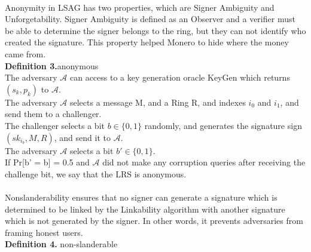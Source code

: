     \\
    Anonymity in LSAG has two properties, which are Signer Ambiguity and Unforgetability. Signer Ambiguity is defined as an Observer and a verifier must be able to determine the signer belongs to the ring, but they can not identify who created the signature. This property helped Monero to hide where the money came from.\\
    \textbf{Definition 3.}anonymous\\
    The adversary $\mathcal A $ can access to a key generation oracle KeyGen which returns $(s_{k},p_{k})$ to $\mathcal A $.\\
    The adversary $\mathcal A $ selects a message M, and a Ring R, and indexes $i_0$ and $i_1$, and send them to a challenger. \\
    The challenger selects a bit $b \in \{ 0,1 \}$ randomly, and generates the signature sign$(sk_{i_b},M,R)$, and send it to $\mathcal A $.\\
    The adversary $\mathcal A $ selects a bit $b' \in \{ 0,1 \}$.\\
    If Pr[b' = b] = 0.5 and $\mathcal A $ did not make any corruption queries after receiving the challenge bit, we say that the LRS is anonymous.\\
    \\
    Nonslanderability ensures that no signer can generate a signature which is determined to be linked by the Linkability algorithm with another signature which is not generated by the signer. In other words, it prevents adversaries from framing honest users.\\
    \textbf{Definition 4.} non-slanderable\\
    
